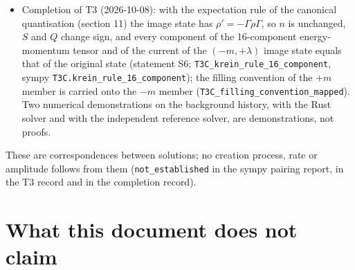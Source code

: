 \documentclass[11pt]{article}
\begin{document}
\begin{itemize}
\item Completion of T3 (2026-10-08): with the expectation rule of the canonical quantisation (section 11) the image state has $\rho' = -\Gamma\rho\Gamma$, so $n$ is unchanged, $S$ and $Q$ change sign, and every component of the 16-component energy-momentum tensor and of the current of the $(-m, +\lambda)$ image state equals that of the original state (statement S6; \texttt{T3C\_krei\allowbreak{}n\_rule\_1\allowbreak{}6\_compon\allowbreak{}ent}, sympy \texttt{T3C.krei\allowbreak{}n\_rule\_1\allowbreak{}6\_compon\allowbreak{}ent}); the filling convention of the $+m$ member is carried onto the $-m$ member (\texttt{T3C\_fill\allowbreak{}ing\_conv\allowbreak{}ention\_m\allowbreak{}apped}). Two numerical demonstrations on the background history, with the Rust solver and with the independent reference solver, are demonstrations, not proofs.
\end{itemize}

These are correspondences between solutions; no creation process, rate or amplitude follows from them (\texttt{not\_esta\allowbreak{}blished} in the sympy pairing report, in the T3 record and in the completion record).

\section{What this document does not claim}
\end{document}
